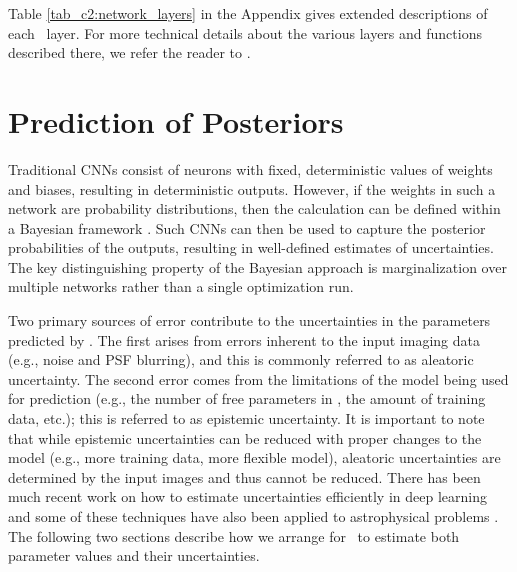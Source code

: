 Table \ref{tab_c2:network_layers} in the Appendix gives extended descriptions of each \gampen\ layer. 
For more technical details about the various layers and functions described there, we refer the reader to \cite{nielsen,goodfellow_16,chollet_21}.


\section{Prediction of Posteriors} \label{sec_c2:uncertainties}
Traditional CNNs consist of neurons with fixed, deterministic values of weights and biases, resulting in deterministic outputs. However, if the weights in such a network are probability distributions, then the calculation can be defined within a Bayesian framework \citep{denker_91}. Such CNNs can then be used to capture the posterior probabilities of the outputs, resulting in well-defined estimates of uncertainties. The key distinguishing property of the Bayesian approach is marginalization over multiple networks rather than a single optimization run. 

Two primary sources of error contribute to the uncertainties in the parameters predicted by \gampen{}. The first arises from errors inherent to the input imaging data (e.g., noise and PSF blurring), and this is commonly referred to as aleatoric uncertainty. The second error comes from the limitations of the model being used for prediction (e.g., the number of free parameters in \gampen{}, the amount of training data, etc.); this is referred to as epistemic uncertainty. It is important to note that while epistemic uncertainties can be reduced with proper changes to the model (e.g., more training data, more flexible model), aleatoric uncertainties are determined by the input images and thus cannot be reduced. There has been much recent work on how to estimate uncertainties efficiently in deep learning \citep[e.g.,][]{gal_2016,Kendall2017WhatVision,Pawlowski2017ImplicitNetworks,Wilson2020BayesianGeneralization} and some of these techniques have also been applied to astrophysical problems \citep[e.g.,][]{PerreaultLevasseur2017UncertaintiesLensing, Walmsley2020GalaxyLearning, Wagner-Carena2021HierarchicalLensing, Cranmer2021ASystems}. The following two sections describe how we arrange for \gampen\ to estimate both parameter values and their uncertainties.

